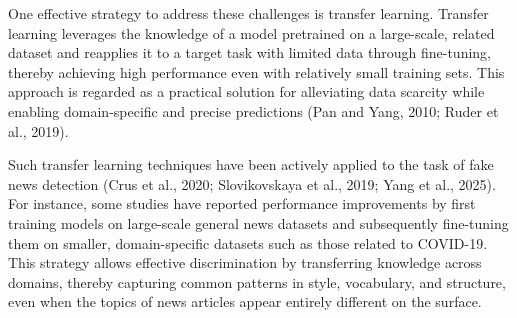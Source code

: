\documentclass[a4paper,fleqn]{cas-sc}
\begin{document}
One effective strategy to address these challenges is transfer learning. Transfer learning leverages the knowledge of a model pretrained on a large-scale, related dataset and reapplies it to a target task with limited data through fine-tuning, thereby achieving high performance even with relatively small training sets. This approach is regarded as a practical solution for alleviating data scarcity while enabling domain-specific and precise predictions (Pan and Yang, 2010; Ruder et al., 2019).

Such transfer learning techniques have been actively applied to the task of fake news detection (Crus et al., 2020; Slovikovskaya et al., 2019; Yang et al., 2025). For instance, some studies have reported performance improvements by first training models on large-scale general news datasets and subsequently fine-tuning them on smaller, domain-specific datasets such as those related to COVID-19. This strategy allows effective discrimination by transferring knowledge across domains, thereby capturing common patterns in style, vocabulary, and structure, even when the topics of news articles appear entirely different on the surface.
\end{document}
